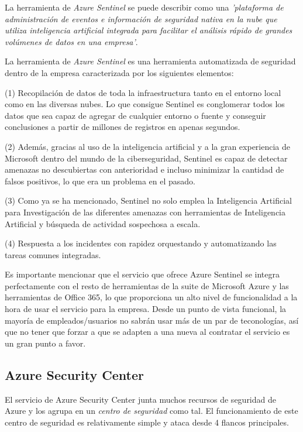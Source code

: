 \documentclass[english,runningheads,a4paper]{llncs}[2018/03/10]
\begin{document}
La herramienta de \textit{Azure Sentinel} se puede describir como una
\textit{'plataforma de administración de eventos e información de seguridad
nativa en la nube que utiliza inteligencia artificial integrada para facilitar
el análisis rápido de grandes volúmenes de datos en una empresa'}. 

La herramienta de \textit{Azure Sentinel} es una herramienta automatizada de 
seguridad dentro
de la empresa caracterizada por los siguientes elementos:

(1) Recopilación de datos de toda la infraestructura tanto en el entorno local
como en las diversas nubes. Lo que consigue Sentinel es conglomerar todos los
datos que sea capaz de agregar de cualquier entorno o fuente y conseguir
conclusiones a partir de millones de registros en apenas segundos. 

(2) Además, gracias al uso de la inteligencia artificial y a la
gran experiencia de Microsoft dentro del mundo de la ciberseguridad, Sentinel es
capaz de detectar amenazas no descubiertas con anterioridad e incluso minimizar
la cantidad de falsos positivos, lo que era un problema en el pasado.

(3) Como ya se ha mencionado, Sentinel no solo emplea la Inteligencia Artificial
para Investigación de las diferentes amenazas con herramientas de Inteligencia
Artificial y búsqueda de actividad sospechosa a escala.

(4) Respuesta a los incidentes con rapidez orquestando y automatizando las
tareas comunes integradas.

Es importante mencionar que el servicio que ofrece Azure Sentinel se integra
perfectamente con el resto de herramientas de la suite de Microsoft Azure y las
herramientas de Office 365, lo que proporciona un alto nivel de funcionalidad a
la hora de usar el servicio para la empresa. Desde un punto de vista
funcional, la mayoría de empleados/usuarios no sabrán usar más de un par de
teconologías, así que no tener que forzar a que se adapten a una nueva al
contratar el servicio es un gran punto a favor.

\subsection*{Azure Security Center}

El servicio de Azure Security Center junta muchos recursos de seguridad de Azure
y los agrupa en un \textit{centro de seguridad} como tal. El funcionamiento de
este centro de seguridad es relativamente simple y ataca desde 4 flancos
principales.
\end{document}
